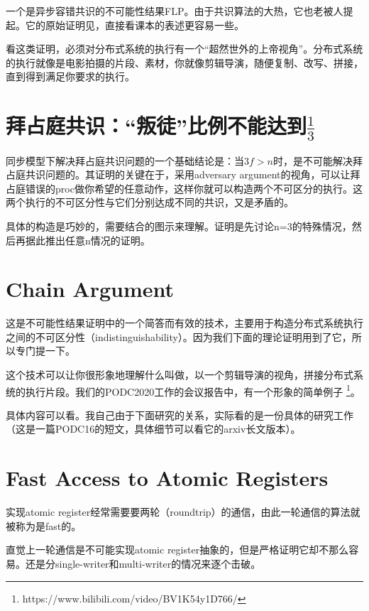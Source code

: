 \documentclass[UTF8]{ctexrep}
\begin{document}
一个是异步容错共识的不可能性结果FLP。由于共识算法的大热，它也老被人提起。它的原始证明见\cite{Fischer85}，直接看课本的表述更容易一些\cite{Attiya14}。

看这类证明，必须对分布式系统的执行有一个“超然世外的上帝视角”。分布式系统的执行就像是电影拍摄的片段、素材，你就像剪辑导演，随便复制、改写、拼接，直到得到满足你要求的执行。

\section{拜占庭共识：“叛徒”比例不能达到$\frac{1}{3}$}

同步模型下解决拜占庭共识问题的一个基础结论是：当$3f>n$时，是不可能解决拜占庭共识问题的。其证明的关键在于，采用adversary argument的视角，可以让拜占庭错误的proc做你希望的任意动作，这样你就可以构造两个不可区分的执行。这两个执行的不可区分性与它们分别达成不同的共识，又是矛盾的。

具体的构造是巧妙的，需要结合\cite[Sec 5.2.3]{Attiya04}的图示来理解。证明是先讨论n=3的特殊情况，然后再据此推出任意n情况的证明。

\section{Chain Argument}

这是不可能性结果证明中的一个简答而有效的技术，主要用于构造分布式系统执行之间的不可区分性（indistinguishability）。因为我们下面的理论证明用到了它，所以专门提一下。

这个技术可以让你很形象地理解什么叫做，以一个剪辑导演的视角，拼接分布式系统的执行片段。我们的PODC2020工作的会议报告中，有一个形象的简单例子 \footnote{https://www.bilibili.com/video/BV1K54y1D766/}。

具体内容可以看\cite[Chap 2]{Attiya14}。我自己由于下面研究的关系，实际看的是一份具体的研究工作\cite{Hadjistasi16}（这是一篇PODC16的短文，具体细节可以看它的arxiv长文版本）。

\section{Fast Access to Atomic Registers}

实现atomic register经常需要要两轮（roundtrip）的通信，由此一轮通信的算法就被称为是fast的。

直觉上一轮通信是不可能实现atomic register抽象的，但是严格证明它却不那么容易。还是分single-writer和multi-writer的情况来逐个击破。
\end{document}
